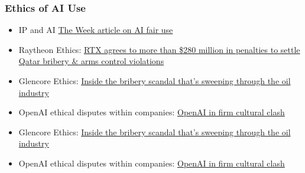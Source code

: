\documentclass[
  11pt,
]{article}
\providecommand{\tightlist}{%
  \setlength{\itemsep}{0pt}\setlength{\parskip}{0pt}}
\begin{document}
\subsubsection{Ethics of AI Use}\label{ethics-of-ai-use}

\begin{itemize}
\tightlist
\item
  IP and AI
  \href{https://theweek.com/tech/ai-fair-use-copyrighted-media-trains-bots}{The
  Week article on AI fair use}
\item
  Raytheon Ethics:
  \href{https://www.wsj.com/articles/rtx-agrees-to-more-than-280-million-in-penalties-to-settle-qatar-bribery-arms-control-violations-7368bf98?gaa_at=eafs&gaa_n=ASWzDAiE1z_s4buplQHYLUrzC8wR7x8ZeyDpQfmuQ1jNPC2pP_Jlvzp55qq7&gaa_sig=iVMI5Rj_kpBXM3-jcEi7EpdJeDq0X_0rZKIZSXoRcXHd1lx16d508-WH2zXsQ0gzXTPNK5K8Jg6y84RgOOK_IQ\%3D\%3D&gaa_ts=688be7a3}{RTX
  agrees to more than \$280 million in penalties to settle Qatar bribery
  \& arms control violations}
\item
  Glencore Ethics:
  \href{https://www.wsj.com/articles/inside-the-bribery-scandal-thats-sweeping-through-the-oil-industry-1518543648?gaa_at=eafs&gaa_n=ASWzDAjonC0ZvhOArbiu8fQmhaoIAPVBIEzyrt6edgKhfrs68TM_sYuKhM5b&gaa_sig=QXWvAA2pGRTO0SMy3UziYWQM3VHC4AgG7DTH-45eimDi-Yb7zFq2Z069trhFEsfSzIxNZ985EXf6nfVzo_nRKg\%3D\%3D&gaa_ts=688be7a3}{Inside
  the bribery scandal that's sweeping through the oil industry}
\item
  OpenAI ethical disputes within companies:
  \href{https://archive.ph/rR3Gt\#selection-565.3-593.46}{OpenAI in firm
  cultural clash}
\item
  Glencore Ethics:
  \href{https://www.wsj.com/articles/inside-the-bribery-scandal-thats-sweeping-through-the-oil-industry-1518543648?gaa_at=eafs&gaa_n=ASWzDAjonC0ZvhOArbiu8fQmhaoIAPVBIEzyrt6edgKhfrs68TM_sYuKhM5b&gaa_sig=QXWvAA2pGRTO0SMy3UziYWQM3VHC4AgG7DTH-45eimDi-Yb7zFq2Z069trhFEsfSzIxNZ985EXf6nfVzo_nRKg\%3D\%3D&gaa_ts=688be7a3}{Inside
  the bribery scandal that's sweeping through the oil industry}
\item
  OpenAI ethical disputes within companies:
  \href{https://archive.ph/rR3Gt\#selection-565.3-593.46}{OpenAI in firm
  cultural clash}
\end{itemize}


\printbibliography
\end{document}
